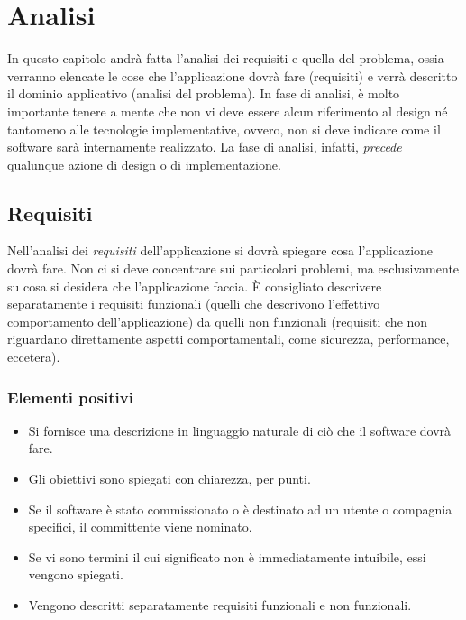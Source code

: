 \documentclass[a4paper,12pt]{report}
\begin{document}
\tableofcontents

\chapter{Analisi}

In questo capitolo andrà fatta l'analisi dei requisiti e quella del problema, ossia verranno elencate le cose che l'applicazione dovrà fare (requisiti) e verrà descritto il dominio applicativo (analisi del problema).
%
In fase di analisi, è molto importante tenere a mente che non vi deve essere alcun riferimento al design né tantomeno alle tecnologie implementative, ovvero, non si deve indicare come il software sarà internamente realizzato.
%
La fase di analisi, infatti, \textit{precede} qualunque azione di design o di implementazione.

\section{Requisiti}

Nell'analisi dei \emph{requisiti} dell'applicazione si dovrà spiegare cosa l'applicazione dovrà fare.
%
Non ci si deve concentrare sui particolari problemi, ma esclusivamente su cosa si desidera che l'applicazione faccia.
%
È consigliato descrivere separatamente i requisiti funzionali (quelli che descrivono l'effettivo 
comportamento dell'applicazione) da quelli non funzionali (requisiti che non riguardano direttamente 
aspetti comportamentali, come sicurezza, performance, eccetera).

\subsection*{Elementi positivi}
\begin{itemize}
	\item Si fornisce una descrizione in linguaggio naturale di ciò che il software dovrà fare.
	\item Gli obiettivi sono spiegati con chiarezza, per punti.
	\item Se il software è stato commissionato o è destinato ad un utente o compagnia specifici, il committente viene nominato.
	\item Se vi sono termini il cui significato non è immediatamente intuibile, essi vengono spiegati.
	\item Vengono descritti separatamente requisiti funzionali e non funzionali.
\end{itemize}
\end{document}
